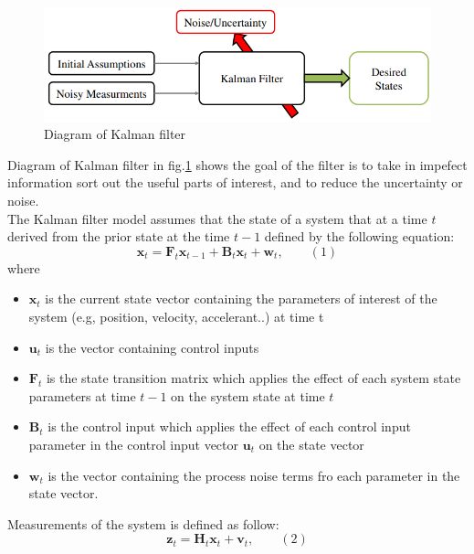 \begin{figure}[h!]
        \centering
        \includegraphics[width=\textwidth]{Chapters/Fig/kalman_dig.png}
        \caption{Diagram of Kalman filter}
        \label{fig:kalman_dig}
\end{figure}
Diagram of Kalman filter in fig.\ref{fig:kalman_dig} shows the goal of the filter is to take in impefect information sort out the useful parts of interest, and to reduce the uncertainty or noise.\\
The Kalman filter model assumes that the state of a system that at a time $t$ derived from the prior state at the time $t-1$ defined by the following equation:
\begin{displaymath}
 \textbf{x}_t = \textbf{F}_t \textbf{x}_{t-1} + \textbf{B}_t \textbf{x}_t + \textbf{w}_t,\qquad (1)
\end{displaymath}
where
\begin{itemize}
    \item $\textbf{x}_t$ is the current state vector containing the parameters of interest of the system (e.g, position, velocity, accelerant..) at time t
    \item $\textbf{u}_t$ is the vector containing control inputs
    \item $\textbf{F}_t$ is the state transition matrix which applies the effect of each system state parameters at time $t-1$ on the system state at time $t$
    \item $\textbf{B}_t$ is the control input which applies the effect of each control input parameter in the control input vector $\textbf{u}_t$ on the state vector
    \item $\textbf{w}_t$ is the vector containing the process noise terms fro each parameter in the state vector.
\end{itemize}
\pagebreak
Measurements of the system is defined as follow:
\begin{displaymath}
         \textbf{z}_t = \textbf{H}_t\textbf{x}_t + \textbf{v}_t,\qquad (2)
\end{displaymath}

